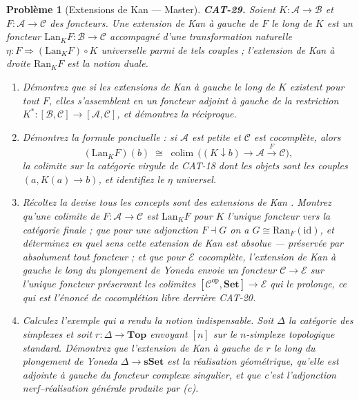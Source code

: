\documentclass[11pt]{article}
\newtheorem{problem}{Problème}
\begin{document}
\begin{problem}[{Extensions de Kan --- Master}]
\textbf{CAT-29.} Soient $ K \colon \mathcal{A} \to \mathcal{B} $ et
$ F \colon \mathcal{A} \to \mathcal{C} $ des foncteurs. Une \textit{extension de Kan à gauche} de
$ F $ le long de $ K $ est un foncteur $ \mathrm{Lan}_K F \colon \mathcal{B} \to \mathcal{C} $
accompagné d'une transformation naturelle $ \eta \colon F \Rightarrow (\mathrm{Lan}_K F) \circ K $
universelle parmi de tels couples ; l'extension de Kan à droite $ \mathrm{Ran}_K F $ est la
notion duale.
\begin{enumerate}
\item[(a)] Démontrez que si les extensions de Kan à gauche le long de $ K $ existent pour tout $ F $,
elles s'assemblent en un foncteur adjoint à gauche de la restriction
$ K^{*} \colon [\mathcal{B}, \mathcal{C}] \to [\mathcal{A}, \mathcal{C}] $, et démontrez la
réciproque.
\item[(b)] Démontrez la formule ponctuelle : si $ \mathcal{A} $ est petite et $ \mathcal{C} $ est
cocomplète, alors
\[ (\mathrm{Lan}_K F)(b) \;\cong\; \operatorname*{colim}\, \bigl( (K \downarrow b) \to
\mathcal{A} \xrightarrow{\ F\ } \mathcal{C} \bigr), \]
la colimite sur la catégorie virgule de CAT-18 dont les objets sont les couples
$ (a, K(a) \to b) $, et identifiez le $ \eta $ universel.
\item[(c)] Récoltez la devise \og{} tous les concepts sont des extensions de Kan \fg{}. Montrez qu'une colimite de
$ F \colon \mathcal{A} \to \mathcal{C} $ est $ \mathrm{Lan}_K F $ pour $ K $ l'unique
foncteur vers la catégorie finale ; que pour une adjonction $ F \dashv G $ on a
$ G \cong \mathrm{Ran}_F(\mathrm{id}) $, et déterminez en quel sens cette extension de Kan est
\textit{absolue} --- préservée par absolument tout foncteur ; et que pour $ \mathcal{E} $
cocomplète, l'extension de Kan à gauche le long du plongement de Yoneda envoie un foncteur
$ \mathcal{C} \to \mathcal{E} $ sur l'unique foncteur préservant les colimites
$ [\mathcal{C}^{\mathrm{op}}, \mathbf{Set}] \to \mathcal{E} $ qui le prolonge, ce qui est
l'énoncé de cocomplétion libre derrière CAT-20.
\item[(d)] Calculez l'exemple qui a rendu la notion indispensable. Soit $ \Delta $ la catégorie des
simplexes et soit $ r \colon \Delta \to \mathbf{Top} $ envoyant $ [n] $ sur le
$ n $-simplexe topologique standard. Démontrez que l'extension de Kan à gauche de $ r $ le long
du plongement de Yoneda $ \Delta \to \mathbf{sSet} $ est la réalisation géométrique, qu'elle est
adjointe à gauche du foncteur complexe singulier, et que c'est l'adjonction nerf--réalisation
générale produite par (c).
\end{enumerate}

\end{problem}
\end{document}
